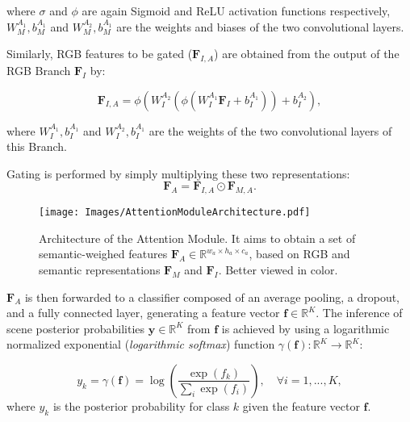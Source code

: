 \documentclass[review, 3p, sort&compress]{elsarticle}
\begin{document}
where \(\sigma\) and \(\phi\) are again Sigmoid and ReLU activation functions respectively, \( W^{A_1}_M, b^{A_1}_M \) and \(W^{A_2}_M, b^{A_1}_M\) are the weights and biases of the two convolutional layers. 

Similarly, RGB features to be gated (\(\textbf{F}_{I,A}\)) are obtained from the output of the RGB Branch \(\textbf{F}_I\) by:

\begin{equation}
    \textbf{F}_{I,A} =   \phi \left( W^{A_2}_I  \left( \phi \left(  W^{A_1}_I \textbf{F}_I + b^{A_1}_I \right)   \right)  + b^{A_2}_I \right),
\end{equation}

where \( W^{A_1}_I, b^{A_1}_I \) and \(W^{A_2}_I, b^{A_1}_I\) are the weights of the two convolutional layers of this Branch.

Gating is performed by simply multiplying these two representations:
\begin{equation}
    \textbf{F}_A = 
    \textbf{F}_{I,A} \odot \textbf{F}_{M,A}.
\end{equation}

\begin{figure}[t!]
    \centering
    \texttt{[image: Images/AttentionModuleArchitecture.pdf]}
    \caption{Architecture of the Attention Module. It aims to obtain a set of semantic-weighed features \(\textbf{F}_{A} \in \mathbb{R}^{w_a \times h_a \times c_a}\), based on RGB and semantic representations \(\textbf{F}_{M}\) and \(\textbf{F}_{I}\). Better viewed in color.}
    \label{fig:Attention Module Architecture}
\end{figure}

\(\textbf{F}_A\) is then forwarded to a classifier composed of an average pooling, a dropout, and a fully connected layer, generating a feature vector \(\textbf{f} \in \mathbb{R}^K\).
The inference of scene posterior probabilities \(\textbf{y} \in \mathbb{R}^K\) from \(\textbf{f}\) is achieved by using a logarithmic normalized exponential (\textit{logarithmic softmax}) function \(\gamma(\textbf{f}) : \mathbb{R}^K \rightarrow \mathbb{R}^K\):

\begin{equation}
    \label{eq:softmax}
        y_k = \gamma(\textbf{f}) = \log \left( \frac{\exp(f_k)}{\sum^{}_i \exp(f_i)} \right), \quad \forall i = 1,...,K,
\end{equation}
where \(y_k\) is the posterior probability for class \(k\) given the feature vector \(\textbf{f}\).
\end{document}
